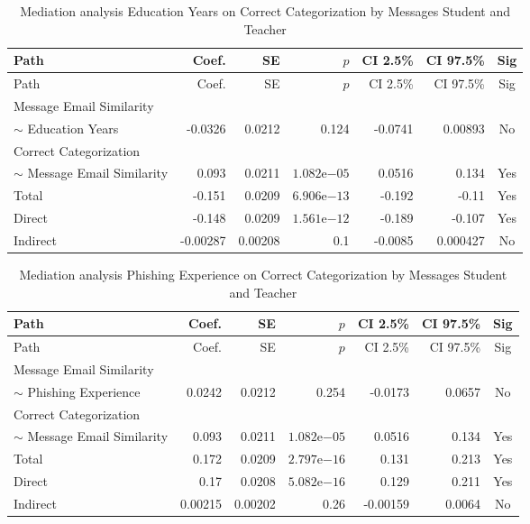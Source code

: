 \begin{longtable}{lrrrrrc}
            \caption{Mediation analysis Education Years on Correct Categorization by  Messages Student and Teacher}\label{tab:mediation Education Years on Correct Categorization by  Messages Student and Teacher}\\
            \toprule
            Path & Coef. & SE & $p$ & CI 2.5\% & CI 97.5\% & Sig \\
            \midrule
            \endfirsthead
            \toprule
            Path & Coef. & SE & $p$ & CI 2.5\% & CI 97.5\% & Sig \\
            \midrule
            \endhead
            \bottomrule
            \endfoot
            Message Email Similarity\\ $\sim$ Education Years & -0.0326 & 0.0212 & 0.124 & -0.0741 & 0.00893 & No \\
Correct Categorization\\ $\sim$ Message Email Similarity & 0.093 & 0.0211 & $1.082\mathrm{e}{-05}$ & 0.0516 & 0.134 & Yes \\
Total & -0.151 & 0.0209 & $6.906\mathrm{e}{-13}$ & -0.192 & -0.11 & Yes \\
Direct & -0.148 & 0.0209 & $1.561\mathrm{e}{-12}$ & -0.189 & -0.107 & Yes \\
Indirect & -0.00287 & 0.00208 & 0.1 & -0.0085 & 0.000427 & No \\
\end{longtable}

\begin{longtable}{lrrrrrc}
            \caption{Mediation analysis Phishing Experience on Correct Categorization by  Messages Student and Teacher}\label{tab:mediation Phishing Experience on Correct Categorization by  Messages Student and Teacher}\\
            \toprule
            Path & Coef. & SE & $p$ & CI 2.5\% & CI 97.5\% & Sig \\
            \midrule
            \endfirsthead
            \toprule
            Path & Coef. & SE & $p$ & CI 2.5\% & CI 97.5\% & Sig \\
            \midrule
            \endhead
            \bottomrule
            \endfoot
            Message Email Similarity\\ $\sim$ Phishing Experience & 0.0242 & 0.0212 & 0.254 & -0.0173 & 0.0657 & No \\
Correct Categorization\\ $\sim$ Message Email Similarity & 0.093 & 0.0211 & $1.082\mathrm{e}{-05}$ & 0.0516 & 0.134 & Yes \\
Total & 0.172 & 0.0209 & $2.797\mathrm{e}{-16}$ & 0.131 & 0.213 & Yes \\
Direct & 0.17 & 0.0208 & $5.082\mathrm{e}{-16}$ & 0.129 & 0.211 & Yes \\
Indirect & 0.00215 & 0.00202 & 0.26 & -0.00159 & 0.0064 & No \\
\end{longtable}

